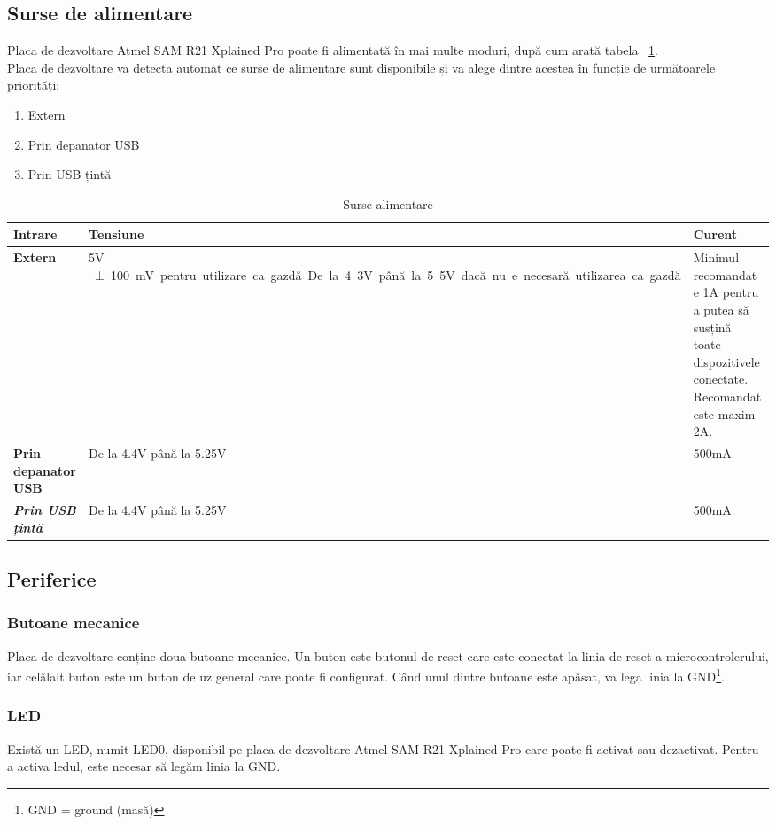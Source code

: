 \documentclass[12pt,a4paper]{report}
\begin{document}
\subsection{Surse de alimentare}
Placa de dezvoltare Atmel SAM R21 Xplained Pro poate fi alimentată în mai multe moduri, după cum arată tabela ~\ref{tab:surse}. \\
Placa de dezvoltare va detecta automat ce surse de alimentare sunt disponibile și va alege dintre acestea în funcție de următoarele priorități:
\begin{enumerate}
	\item{Extern}
	\item{Prin depanator USB}
	\item{Prin USB țintă}
\end{enumerate}

\begin{table}[th]\small\linespread{1}
\caption{Surse alimentare}
\label{tab:surse}
\begin{tabular}{l >{\raggedright\arraybackslash}p{8cm} >{\raggedright\arraybackslash}p{4cm}}
\textbf{Intrare} & \textbf{Tensiune} & \textbf{Curent} \\\hline
\textbf{Extern} & 5V \SI{\pm 100}mV pentru utilizare ca gazdă.  De la 4.3V până la 5.5V dacă nu e necesară utilizarea ca gazdă & Minimul recomandat e 1A pentru a putea să susțină toate dispozitivele conectate. Recomandat este maxim 2A.\\\hline
\textbf{Prin depanator USB} & De la 4.4V până la 5.25V & 500mA \\
\hline
\textbf{\textit{Prin USB țintă}} & De la 4.4V până la 5.25V & 500mA \\
\hline
\end{tabular}
\end{table}

\subsection{Periferice}
\subsubsection{Butoane mecanice}
Placa de dezvoltare conține doua butoane mecanice. Un buton este butonul de reset care este conectat la linia de reset a microcontrolerului, iar celălalt buton este un buton de uz general care poate fi configurat. Când unul dintre butoane este apăsat, va lega linia la GND\footnote{GND = ground (masă)}.

\subsubsection{LED}
Există un LED, numit LED0, disponibil pe placa de dezvoltare Atmel SAM R21 Xplained Pro care poate fi activat sau dezactivat. Pentru a activa ledul, este necesar să legăm linia la GND.
\end{document}
